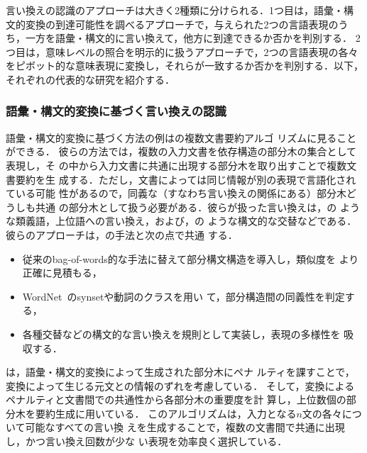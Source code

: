 言い換えの認識のアプローチは大きく2種類に分けられる．1つ目は，語彙・構
文的変換の到達可能性を調べるアプローチで，与えられた2つの言語表現のう
ち，一方を語彙・構文的に言い換えて，他方に到達できるか否かを判別する．
2つ目は，意味レベルの照合を明示的に扱うアプローチで，2つの言語表現の各々
をピボット的な意味表現に変換し，それらが一致するか否かを判別する．以下，
それぞれの代表的な研究を紹介する．

\subsubsection{語彙・構文的変換に基づく言い換えの認識}

語彙・構文的変換に基づく方法の例はの複数文書要約アルゴ
リズムに見ることができる．
彼らの方法では，複数の入力文書を依存構造の部分木の集合として表現し，そ
の中から入力文書に共通に出現する部分木を取り出すことで複数文書要約を生
成する．ただし，文書によっては同じ情報が別の表現で言語化されている可能
性があるので，同義な（すなわち言い換えの関係にある）部分木どうしも共通
の部分木として扱う必要がある．彼らが扱った言い換えは，の
ような類義語，上位語への言い換え，および，の
ような構文的な交替などである．
彼らのアプローチは，の手法と次の点で共通
する．
\begin{itemize}
\item 従来のbag-of-words的な手法に替えて部分構文構造を導入し，類似度を
より正確に見積もる\cite{mckeown:99}，
\item WordNet~\cite{WN:90}のsynsetや動詞のクラス\cite{levin:93}を用い
て，部分構造間の同義性を判定する\cite{mckeown:99,barzilay:99}，
\item 各種交替などの構文的な言い換えを規則として実装し，表現の多様性を
吸収する\cite{barzilay:99}．
\end{itemize}
\citeauthor{ueda:00}は，語彙・構文的変換によって生成された部分木にペナ
ルティを課すことで，変換によって生じる元文との情報のずれを考慮している．
そして，変換によるペナルティと文書間での共通性から各部分木の重要度を計
算し，上位数個の部分木を要約生成に用いている．
このアルゴリズムは，入力となる$n$文の各々について可能なすべての言い換
えを生成することで，複数の文書間で共通に出現し，かつ言い換え回数が少な
い表現を効率良く選択している．

